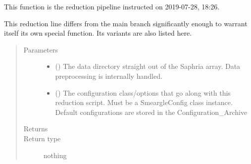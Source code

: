 \documentclass[letterpaper,10pt,english]{sphinxmanual}
\begin{document}
\begin{fulllineitems}
\label{\detokenize{python_docstrings/IfA_Smeargle.zulu.detector_pipelines.saphria_pipeline:IfA_Smeargle.zulu.detector_pipelines.saphria_pipeline.SA201907281826_reduction_pipeline}}
This function is the reduction pipeline instructed on 2019-07-28,
18:26.

This reduction line differs from the main branch significantly enough to
warrant itself its own special function. Its variants are also listed here.
\begin{quote}\begin{description}
\item[{Parameters}] \leavevmode\begin{itemize}
\item {} 
 () \textendash{} The data directory straight out of the Saphria array. Data
preprocessing is internally handled.

\item {} 
 () \textendash{} The configuration class/options that go along with this reduction
script. Must be a SmeargleConfig class instance. Default
configurations are stored in the Configuration\_Archive

\end{itemize}

\item[{Returns}] \leavevmode


\item[{Return type}] \leavevmode
nothing

\end{description}\end{quote}

\end{fulllineitems}

\end{document}
